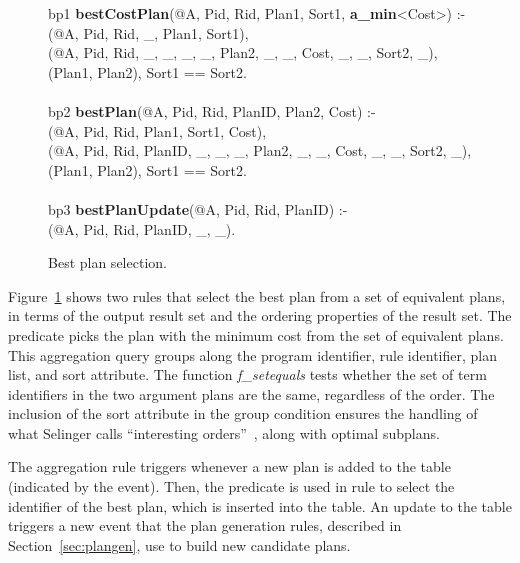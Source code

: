 \begin{figure}
\ssp
\centering
\begin{boxedminipage}{\linewidth}
bp1 {\small \bf bestCostPlan}(@A, Pid, Rid, Plan1, Sort1, {\small \bf a\_min}<Cost>) :- \\
(@A, Pid, Rid, \_, Plan1, Sort1), \\
(@A, Pid, Rid, \_, \_, \_, \_, Plan2, \_, \_, Cost, \_, \_, Sort2, \_), \\
(Plan1, Plan2), Sort1 == Sort2. \\
\\            
bp2 {\small \bf bestPlan}(@A, Pid, Rid, PlanID, Plan2, Cost) :- \\
(@A, Pid, Rid, Plan1, Sort1, Cost), \\
(@A, Pid, Rid, PlanID, \_, \_, \_, Plan2, \_, \_, Cost, \_, \_, Sort2, \_), \\
(Plan1, Plan2), Sort1 == Sort2.\\
\\            
bp3 {\small \bf bestPlanUpdate}(@A, Pid, Rid, PlanID) :- \\
(@A, Pid, Rid, PlanID, \_, \_).
\end{boxedminipage}
\caption{\label{fig:bestplan}Best plan selection.}
\end{figure}

Figure~\ref{fig:bestplan} shows two rules that select the best plan from a 
set of equivalent plans, in terms of the output result set and the ordering 
properties of the result set. The  predicate picks the
plan with the minimum cost from the set of equivalent plans. This aggregation 
query groups along the program identifier, rule identifier, plan list, and sort
attribute. The function {\em f\_setequals} tests whether the set of term identifiers in the two argument plans are the same, regardless of the order. The inclusion
of the sort attribute in the group condition ensures the handling of what Selinger calls ``interesting orders''~\cite{selinger}, along with optimal subplans.
 
The aggregation rule  triggers whenever a new plan is added to the  
table (indicated by the  event). Then, the  predicate is used 
in rule  to select the identifier of the best plan, which is inserted into the  
table. An update to the  table triggers a new  event that the 
plan generation rules, described in Section~\ref{sec:plangen}, use to build new candidate plans.


